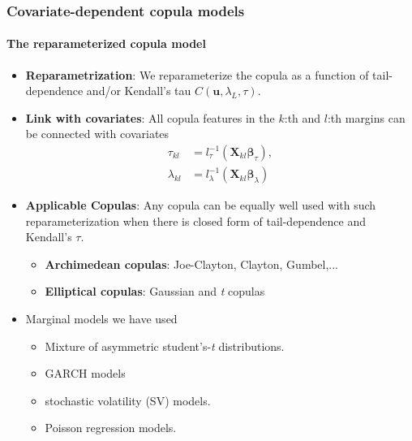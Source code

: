 \documentclass[10pt,aspectratio=169]{beamer}
\begin{document}
\begin{frame}
  \frametitle{Covariate-dependent copula models}
  \framesubtitle{The reparameterized copula model}
  \begin{itemize}


  \item \textbf{Reparametrization}: We reparameterize the copula as a function of
    tail-dependence and/or Kendall's tau $C(\bm{u},\lambda_L,\tau)$.

  \item \textbf{Link with covariates}: All copula features in the $k$:th and $l$:th margins can be connected with
    covariates
      \begin{align*}
        \tau_{kl}&=l_{\tau}^{-1}(\bm{X}_{kl}\bm{\beta}_{\tau}),\\
        \lambda_{kl}&=l_{\lambda}^{-1}(\bm{X}_{kl}\bm{\beta}_{\lambda})
      \end{align*}

    \item \textbf{Applicable Copulas}: Any copula can be equally well used with such
      reparameterization when there is closed form of tail-dependence and Kendall's
      $\tau$.

    \begin{itemize}
    \item \textbf{Archimedean copulas}: Joe-Clayton, Clayton, Gumbel,...
    \item \textbf{Elliptical copulas}: Gaussian and \emph{t} copulas
    \end{itemize}

  \item Marginal models we have used

    \begin{itemize}
    \item Mixture of asymmetric student's-\emph{t} distributions.
    \item GARCH models
    \item stochastic volatility (SV) models.
    \item Poisson regression models.
    \end{itemize}

  \end{itemize}
\end{frame}
\end{document}
